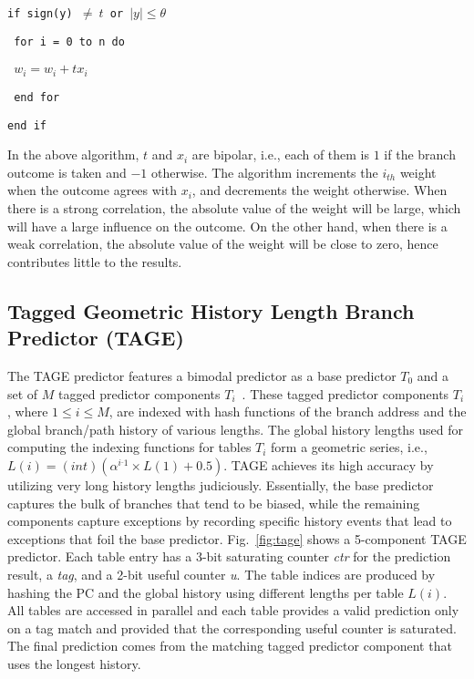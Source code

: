 \begin{spacing}{1} 
\texttt{if sign(y) $\neq\ t$ or $\left| y \right| \leq \theta$}

\texttt{\hspace{8mm} for i = 0 to n do}

\texttt{\hspace{16mm} $w_i = w_i + tx_i$}

\texttt{\hspace{8mm} end for}

\texttt{end if}
\end{spacing}
\vspace{8 mm}

In the above algorithm, $t$ and $x_i$ are bipolar, i.e., each of them is $1$ if the branch outcome is taken and $-1$ otherwise. The algorithm increments the $i_{th}$ weight when the outcome agrees with $x_i$, and decrements the weight otherwise. When there is a strong correlation, the absolute value of the weight will be large, which will have a large influence on the outcome. On the other hand, when there is a weak correlation, the absolute value of the weight will be close to zero, hence contributes little to the results.


\subsection{Tagged Geometric History Length Branch Predictor (TAGE)}
\label{sec:background:dirpred:tage}
The TAGE predictor features a bimodal predictor as a base predictor $T_0$  and a set of $M$ tagged predictor components $T_i$~\cite{tage}. These tagged predictor components $T_i$, where $1\leq i\leq M$, are indexed with hash functions of the branch address and the global branch/path history of various lengths. The global history lengths used for computing the indexing functions for tables $T_i$ form a geometric series, i.e., $L(i) = (int)(\alpha^{i{}^{\_}1}\times L(1)+0.5)$. TAGE achieves its high accuracy by utilizing very long history lengths judiciously.
Essentially, the base predictor captures the bulk of branches that tend to be biased, while the remaining components capture exceptions by recording specific history events that lead to exceptions that foil the base predictor.
Fig.~\ref{fig:tage} shows a 5-component TAGE predictor. Each table entry has a 3-bit saturating counter \textit{ctr} for the prediction result, a \textit{tag}, and a 2-bit useful counter \textit{u}. The table indices are produced by hashing the PC and the global history using different lengths per table $L(i)$. All tables are accessed in parallel and each table provides a valid prediction only on a tag match and provided that the corresponding useful counter is saturated. The final prediction comes from the matching tagged predictor component that uses the longest history.

